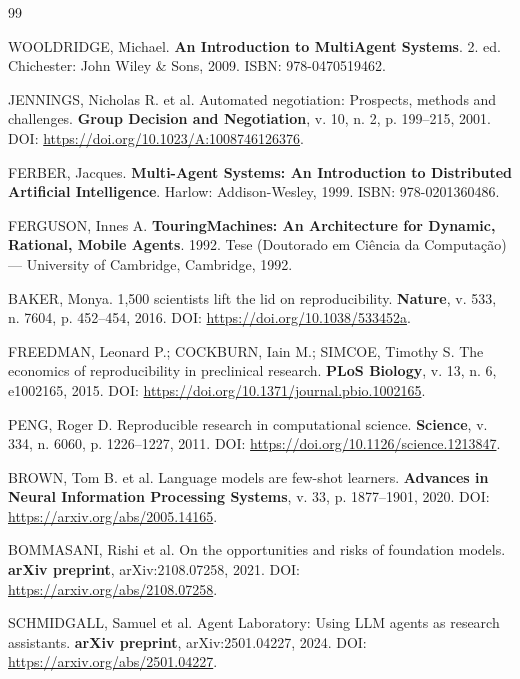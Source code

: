\begin{thebibliography}{99}

WOOLDRIDGE, Michael. \textbf{An Introduction to MultiAgent Systems}. 2. ed. Chichester: John Wiley \& Sons, 2009. ISBN: 978-0470519462.

JENNINGS, Nicholas R. et al. Automated negotiation: Prospects, methods and challenges. \textbf{Group Decision and Negotiation}, v. 10, n. 2, p. 199--215, 2001. DOI: \url{https://doi.org/10.1023/A:1008746126376}.

FERBER, Jacques. \textbf{Multi-Agent Systems: An Introduction to Distributed Artificial Intelligence}. Harlow: Addison-Wesley, 1999. ISBN: 978-0201360486.

FERGUSON, Innes A. \textbf{TouringMachines: An Architecture for Dynamic, Rational, Mobile Agents}. 1992. Tese (Doutorado em Ciência da Computação) --- University of Cambridge, Cambridge, 1992.

BAKER, Monya. 1,500 scientists lift the lid on reproducibility. \textbf{Nature}, v. 533, n. 7604, p. 452--454, 2016. DOI: \url{https://doi.org/10.1038/533452a}.

FREEDMAN, Leonard P.; COCKBURN, Iain M.; SIMCOE, Timothy S. The economics of reproducibility in preclinical research. \textbf{PLoS Biology}, v. 13, n. 6, e1002165, 2015. DOI: \url{https://doi.org/10.1371/journal.pbio.1002165}.

PENG, Roger D. Reproducible research in computational science. \textbf{Science}, v. 334, n. 6060, p. 1226--1227, 2011. DOI: \url{https://doi.org/10.1126/science.1213847}.

BROWN, Tom B. et al. Language models are few-shot learners. \textbf{Advances in Neural Information Processing Systems}, v. 33, p. 1877--1901, 2020. DOI: \url{https://arxiv.org/abs/2005.14165}.

BOMMASANI, Rishi et al. On the opportunities and risks of foundation models. \textbf{arXiv preprint}, arXiv:2108.07258, 2021. DOI: \url{https://arxiv.org/abs/2108.07258}.

SCHMIDGALL, Samuel et al. Agent Laboratory: Using LLM agents as research assistants. \textbf{arXiv preprint}, arXiv:2501.04227, 2024. DOI: \url{https://arxiv.org/abs/2501.04227}.


\end{thebibliography}
